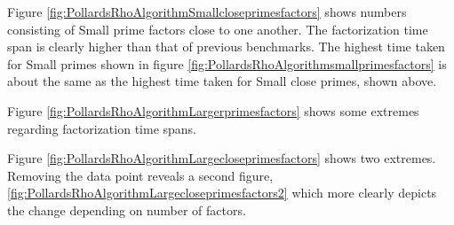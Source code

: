 



Figure \ref{fig:PollardsRhoAlgorithmSmallcloseprimesfactors} shows numbers consisting of Small prime factors close to one another. The factorization time span is clearly higher than that of previous benchmarks. The highest time taken for Small primes shown in figure \ref{fig:PollardsRhoAlgorithmsmallprimesfactors} is about the same as the highest time taken for Small close primes, shown above.



Figure \ref{fig:PollardsRhoAlgorithmLargerprimesfactors} shows some extremes regarding factorization time spans.



Figure \ref{fig:PollardsRhoAlgorithmLargecloseprimesfactors} shows two extremes. Removing the data point reveals a second figure, \ref{fig:PollardsRhoAlgorithmLargecloseprimesfactors2} which more clearly depicts the change depending on number of factors.

